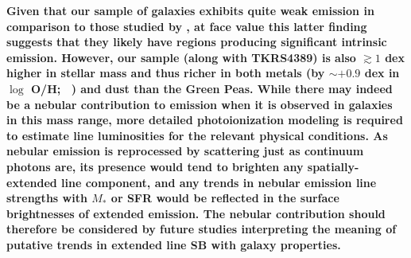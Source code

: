 \documentclass[trackchanges,twocolumn]{aastex62}
\newcommand{\citethnop}[1]{\citeauthor{#1}\ \citeyear{#1}}
\begin{document}
{\bf Given that our sample of galaxies exhibits quite weak emission in comparison to those studied by \citet{Henry2018}, at face value this latter finding suggests that they likely have  regions producing significant intrinsic  emission.
However, our sample (along with TKRS4389) is also $\gtrsim1$ dex higher in stellar mass and thus richer in both metals (by $\sim +0.9$ dex in $\log$ O/H; \citethnop{Zahid2011}) and dust than the \citet{Henry2018} Green Peas.
While there may indeed be a nebular contribution to  emission when it is observed in galaxies in this mass range,  
more detailed photoionization modeling is required to estimate line luminosities for the relevant physical conditions.  As nebular emission is reprocessed by scattering just as continuum photons are, its presence would tend to brighten any spatially-extended line component, and any trends in nebular emission line strengths with $M_*$ or SFR would be reflected in the surface brightnesses of extended emission.
  The nebular contribution should therefore be considered by future studies interpreting the meaning of putative trends in extended line SB with galaxy properties.}



\end{document}
